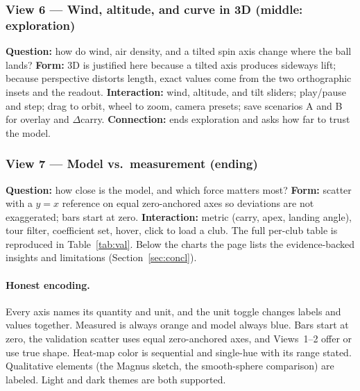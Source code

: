 \documentclass[11pt]{article}
\begin{document}
\subsubsection*{View 6 --- Wind, altitude, and curve in 3D (middle: exploration)}
\textbf{Question:} how do wind, air density, and a tilted spin axis change where the ball lands?
\textbf{Form:} 3D is justified here because a tilted axis produces sideways lift; because perspective
distorts length, exact values come from the two orthographic insets and the readout.
\textbf{Interaction:} wind, altitude, and tilt sliders; play/pause and step; drag to orbit, wheel to
zoom, camera presets; save scenarios A and B for overlay and $\Delta$carry. \textbf{Connection:} ends
exploration and asks how far to trust the model.

\subsubsection*{View 7 --- Model vs.\ measurement (ending)}
\textbf{Question:} how close is the model, and which force matters most? \textbf{Form:} scatter with a
$y=x$ reference on equal zero-anchored axes so deviations are not exaggerated; bars start at zero.
\textbf{Interaction:} metric (carry, apex, landing angle), tour filter, coefficient set, hover, click
to load a club. The full per-club table is reproduced in Table~\ref{tab:val}. Below the charts the page
lists the evidence-backed insights and limitations (Section~\ref{sec:concl}).

\paragraph{Honest encoding.} Every axis names its quantity and unit, and the unit toggle changes
labels and values together. Measured is always orange and model always blue. Bars start at zero,
the validation scatter uses equal zero-anchored axes, and Views~1--2 offer or use true shape. Heat-map
color is sequential and single-hue with its range stated. Qualitative elements (the Magnus sketch, the
smooth-sphere comparison) are labeled. Light and dark themes are both supported.
\end{document}
